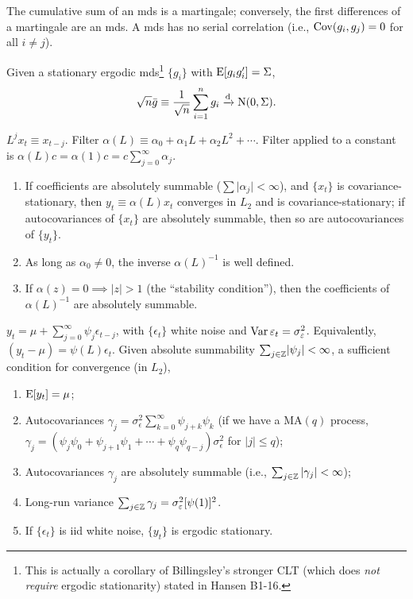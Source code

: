 \documentclass[8pt,letterpaper, landscape]{extarticle} %
\begin{document}
\begin{multicols}{3}
\begin{description}
The cumulative sum of an mds is a martingale; conversely, the first differences of a martingale are an mds. A mds has no serial correlation (i.e., $ \operatorname{Cov} (g_i, g_j) = 0 $ for all $ i \neq j $).

 Given a stationary ergodic mds\footnote{This is actually a corollary of Billingsley's stronger CLT (which does \textit{not require} ergodic stationarity) stated in Hansen B1-16.} $ \{ g_i \} $ with $ \operatorname{E} [g_i g_{i}' ] = \Sigma $, 
$$ \sqrt{n} \bar{g} \equiv \frac{1}{\sqrt{n}} \sum_{i=1}^{n} g_i \xrightarrow{\text{d}} \operatorname{N} (0, \Sigma). $$

 $ L^{j} x_{t} \equiv x_{t-j} $. Filter $ \alpha (L) \equiv \alpha_0 + \alpha_1 L + \alpha_2 L^2 + \dotsb $. Filter applied to a constant is $ \alpha (L) c = \alpha (1) c = c \sum_{j=0}^{\infty} \alpha_j $.
\begin{enumerate}
\item If coefficients are absolutely summable ($ \sum \lvert \alpha_j \rvert < \infty $), and $ \{ x_t \} $ is covariance-stationary, then $ y_t \equiv \alpha (L) x_t $ converges in $ L_2 $ and is covariance-stationary; if autocovariances of $ \{ x_t \} $ are absolutely summable, then so are autocovariances of $ \{ y_t \} $.
\item As long as $ \alpha_0 \neq 0 $, the inverse $ \alpha (L)^{-1} $ is well defined.
\item If $ \alpha (z) = 0 \implies \lvert z \rvert > 1 $ (the ``stability condition''), then the coefficients of $ \alpha (L)^{-1} $ are absolutely summable.
\end{enumerate}

 $ y_t = \mu + \sum _{j=0}^{\infty} \psi_{j} \epsilon_{t-j} $, with $ \{ \epsilon_t \} $ white noise and $ \operatorname{Var} \varepsilon_t = \sigma^2_\varepsilon $. Equivalently, $ (y_t - \mu) = \psi (L) \epsilon_t $. Given absolute summability $ \sum_{j \in \mathbb{Z}} \lvert \psi_j \rvert < \infty $, a sufficient condition for convergence (in $ L_2 $),
\begin{enumerate}
\item $ \operatorname{E} [y_t] = \mu $;
\item Autocovariances $ \gamma_j = \sigma^{2}_\epsilon \sum_{k=0}^{\infty} \psi_{j+k} \psi_{k} $ (if we have a $ \text{MA}(q) $ process, $ \gamma_j = (\psi_j \psi_0 + \psi_{j+1} \psi_{1} + \dotsb + \psi_{q} \psi_{q-j}) \sigma^{2}_\epsilon $ for $ | j | \leq q $);
\item Autocovariances $ \gamma_j $ are absolutely summable (i.e., $ \sum_{j \in \mathbb{Z}} | \gamma_j | < \infty $);
\item Long-run variance $ \sum_{j \in \mathbb{Z}} \gamma_{j} = \sigma^2_\varepsilon [\psi (1)]^{2} $.
\item If $ \{ \epsilon_t \} $ is iid white noise, $ \{ y_t \} $ is ergodic stationary.
\end{enumerate}


\end{description}
\end{multicols}
\end{document}

